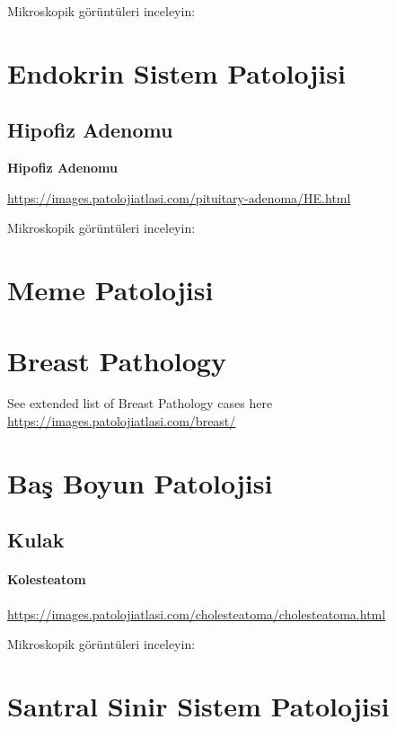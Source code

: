 \documentclass[
  letterpaper,
  DIV=11,
  numbers=noendperiod]{scrreprt}
\begin{document}
Mikroskopik görüntüleri inceleyin:

\part{Endokrin Sistem Patolojisi}

\hypertarget{hipofiz-adenomu}{%
\chapter{Hipofiz Adenomu}\label{hipofiz-adenomu}}

\textbf{Hipofiz Adenomu}

\url{https://images.patolojiatlasi.com/pituitary-adenoma/HE.html}

Mikroskopik görüntüleri inceleyin:

\part{Meme Patolojisi}

\part{Breast Pathology}

See extended list of Breast Pathology cases here
\url{https://images.patolojiatlasi.com/breast/}

\part{Baş Boyun Patolojisi}

\hypertarget{kulak}{%
\chapter{Kulak}\label{kulak}}

\hypertarget{kolesteatom}{%
\subsection{Kolesteatom}\label{kolesteatom}}

\url{https://images.patolojiatlasi.com/cholesteatoma/cholesteatoma.html}

Mikroskopik görüntüleri inceleyin:

\part{Santral Sinir Sistem Patolojisi}
\end{document}
